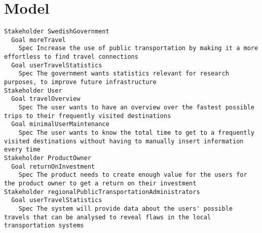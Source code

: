 \chapter{Model}


\begin{lstlisting}
Stakeholder SwedishGovernment
  Goal moreTravel
    Spec Increase the use of public transportation by making it a more effortless to find travel connections
  Goal userTravelStatistics
    Spec The government wants statistics relevant for research purposes, to improve future infrastructure
Stakeholder User
  Goal travelOverview
    Spec The user wants to have an overview over the fastest possible trips to their frequently visited destinations
  Goal minimalUserMaintenance
    Spec The user wants to know the total time to get to a frequently visited destinations without having to manually insert information every time
Stakeholder ProductOwner
  Goal returnOnInvestment
    Spec The product needs to create enough value for the users for the product owner to get a return on their investment
Stakeholder regionalPublicTransportationAdministrators
  Goal userTravelStatistics
    Spec The system will provide data about the users' possible travels that can be analysed to reveal flaws in the local transportation systems

\end{lstlisting}